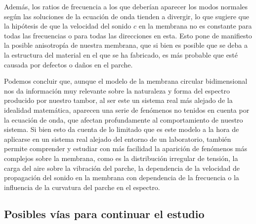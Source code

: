 \documentclass[journal, a4paper,onecolumn]{IEEEtran}
\begin{document}
Además, los ratios de frecuencia a los que deberían aparecer los modos normales según las soluciones de la ecuación de onda tienden a divergir, lo que sugiere que la hipótesis de que la velocidad del sonido $c$ en la membrana no es constante para todas las frecuencias o para todas las direcciones en esta. Esto pone de manifiesto la posible anisotropía de nuestra membrana, que si bien es posible que se deba a la estructura del material en el que se ha fabricado, es más probable que esté causada por defectos o daños en el parche.\newline

Podemos concluir que, aunque el modelo de la membrana circular bidimensional nos da información muy relevante sobre la naturaleza y forma del espectro producido por nuestro tambor, al ser este un sistema real más alejado de la idealidad matemática, aparecen una serie de fenómenos no tenidos en cuenta por la ecuación de onda, que afectan profundamente al comportamiento de nuestro sistema. Si bien esto da cuenta de lo limitado que es este modelo a la hora de aplicarse en un sistema real alejado del entorno de un laboratorio, también permite comprender y estudiar con más facilidad la aparición de fenómenos más complejos sobre la membrana, como es la distribución irregular de tensión, la carga del aire sobre la vibración del parche, la dependencia de la velocidad de propagación del sonido en la membrana con dependencia de la frecuencia o la influencia de la curvatura del parche en el espectro.







 \subsection{Posibles vías para continuar el estudio}
\end{document}
